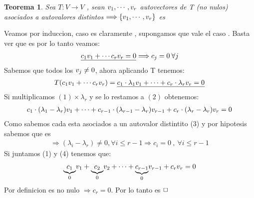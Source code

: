 \documentclass[]{article}
\newtheorem{theorem}{Teorema}
\newenvironment{proof}{\noindent{\bf Prueba:}}{$\hfill \Box$ \vspace{10pt}}
\newcommand{\ida}{\Longrightarrow}
\begin{document}
\begin{theorem}
    Sea $T:V\to V$ \tl , sean $\text{$v_{1}$},\cdots,\text{$v_{r}$}$ autovectores de T (no nulos) asociados a autovalores distintos
    $\ida \conjunto{\vc{1},\cdots,\vc{r}}$ es \li
\end{theorem}
\begin{proof}
    Veamos por induccion, caso  es claramente \li , supongamos que vale el caso
    .
    Basta ver que  es \li por lo tanto veamos:
    \begin{align}
        \underline{c_1\vc{1} + \cdots c_{r}\vc{r}=0} \ida c_j=0 \: \forall j
    \end{align}
    Sabemos que todos los $\text{$v_{j}$}\neq0$, ahora aplicando T tenemos:
    \begin{align}
        \text{$T({c_1\text{$v_{1}$}+\cdots c_{r}\text{$v_{r}$}})$}=\underline{c_1\cdot\lambda_1\text{$v_{1}$} + \cdots+ c_{r}\cdot\lambda_{r}\text{$v_{r}$}=0}
    \end{align}    
    Si multiplicamos $(1) \times \lambda_{r}$ y se lo restamos a $(2)$ obtenemos:
    \begin{align}
        c_1\cdot(\lambda_1 - \lambda_{r} )\text{$v_{1}$} + \cdots
        +c_{r-1}\cdot(\lambda_{r-1} - \lambda_{r} )\text{$v_{r-1}$} + c_{r}\cdot (\lambda_{r}-\lambda_{r})\text{$v_{r}$}=0
    \end{align}
    Como sabemos cada  esta asociados a un autovalor distintito (3) y por hipotesis sabemos que
     es \li
    \begin{align}
        \ida (\lambda_i - \lambda_{r})\neq0 , \forall i\leq r-1 \ida c_i=0 \:,\:\forall i\leq r-1
    \end{align}
    Si juntamos (1) y (4) tenemos que:
    \begin{align*}
        \underset{0}{\underbrace{c_1}}\text{$v_{1}$} + \underset{0}{\underbrace{c_2}}\text{$v_{2}$} +
        \cdots + \underset{0}{\underbrace{c_{r-1}}}\text{$v_{r-1}$} + c_{r}\text{$v_{r}$}=0
    \end{align*}
    Por definicion  es no nulo $\ida c_r =0$. Por lo tanto   es \li
\end{proof}
\end{document}
